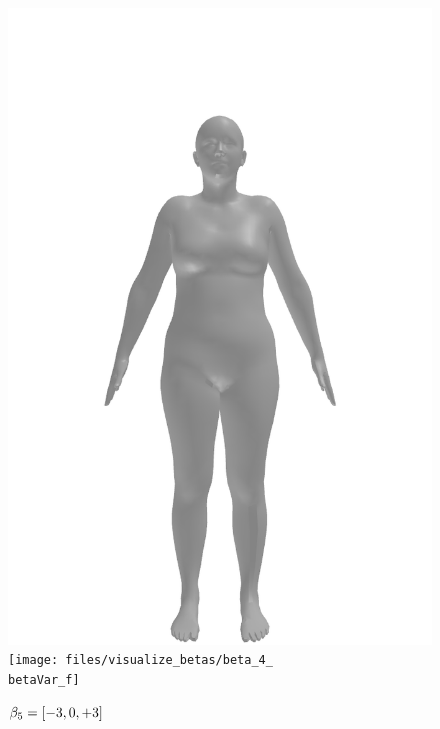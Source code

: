 \begin{figure}[ht!]
\begin{minipage}[b]{\textwidth}
        \includegraphics[width=\imgWidth]{files/visualize_betas/baseline_f}
        \texttt{[image: files/visualize\_betas/beta\_4\_\\betaVar\_f]}
        \caption{$\beta_5 = [-3, 0, +3]$}
    \end{minipage}
\end{figure}

